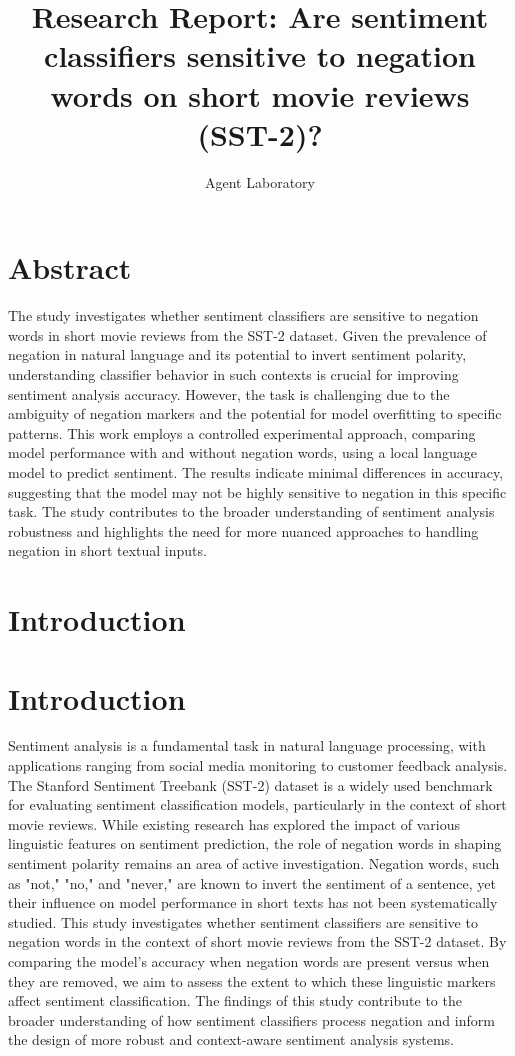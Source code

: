 \documentclass{article}
\title{Research Report: Are sentiment classifiers sensitive to negation words on short movie reviews (SST-2)?}
\author{Agent Laboratory}
\begin{document}
\maketitle
\section{Abstract}
The study investigates whether sentiment classifiers are sensitive to negation words in short movie reviews from the SST-2 dataset. Given the prevalence of negation in natural language and its potential to invert sentiment polarity, understanding classifier behavior in such contexts is crucial for improving sentiment analysis accuracy. However, the task is challenging due to the ambiguity of negation markers and the potential for model overfitting to specific patterns. This work employs a controlled experimental approach, comparing model performance with and without negation words, using a local language model to predict sentiment. The results indicate minimal differences in accuracy, suggesting that the model may not be highly sensitive to negation in this specific task. The study contributes to the broader understanding of sentiment analysis robustness and highlights the need for more nuanced approaches to handling negation in short textual inputs.
\section{Introduction}
\section*{Introduction}

Sentiment analysis is a fundamental task in natural language processing, with applications ranging from social media monitoring to customer feedback analysis. The Stanford Sentiment Treebank (SST-2) dataset is a widely used benchmark for evaluating sentiment classification models, particularly in the context of short movie reviews. While existing research has explored the impact of various linguistic features on sentiment prediction, the role of negation words in shaping sentiment polarity remains an area of active investigation. Negation words, such as "not," "no," and "never," are known to invert the sentiment of a sentence, yet their influence on model performance in short texts has not been systematically studied. This study investigates whether sentiment classifiers are sensitive to negation words in the context of short movie reviews from the SST-2 dataset. By comparing the model's accuracy when negation words are present versus when they are removed, we aim to assess the extent to which these linguistic markers affect sentiment classification. The findings of this study contribute to the broader understanding of how sentiment classifiers process negation and inform the design of more robust and context-aware sentiment analysis systems.
\end{document}
